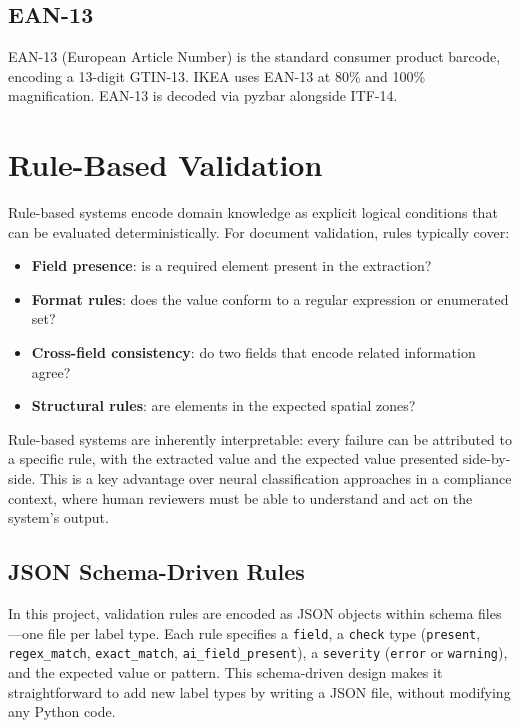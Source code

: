 \subsection{EAN-13}

EAN-13 (European Article Number) is the standard consumer product barcode, encoding a
13-digit GTIN-13. IKEA uses EAN-13 at 80\% and 100\% magnification. EAN-13 is decoded
via pyzbar alongside ITF-14.

\section{Rule-Based Validation}

Rule-based systems encode domain knowledge as explicit logical conditions that can be
evaluated deterministically. For document validation, rules typically cover:

\begin{itemize}
  \item \textbf{Field presence}: is a required element present in the extraction?
  \item \textbf{Format rules}: does the value conform to a regular expression or enumerated
  set?
  \item \textbf{Cross-field consistency}: do two fields that encode related information agree?
  \item \textbf{Structural rules}: are elements in the expected spatial zones?
\end{itemize}

Rule-based systems are inherently interpretable: every failure can be attributed to a specific
rule, with the extracted value and the expected value presented side-by-side. This is a key
advantage over neural classification approaches in a compliance context, where human
reviewers must be able to understand and act on the system's output.

\subsection{JSON Schema-Driven Rules}

In this project, validation rules are encoded as JSON objects within schema files—one file
per label type. Each rule specifies a \texttt{field}, a \texttt{check} type (\texttt{present},
\texttt{regex\_match}, \texttt{exact\_match}, \texttt{ai\_field\_present}), a
\texttt{severity} (\texttt{error} or \texttt{warning}), and the expected value or pattern.
This schema-driven design makes it straightforward to add new label types by writing a JSON
file, without modifying any Python code.

